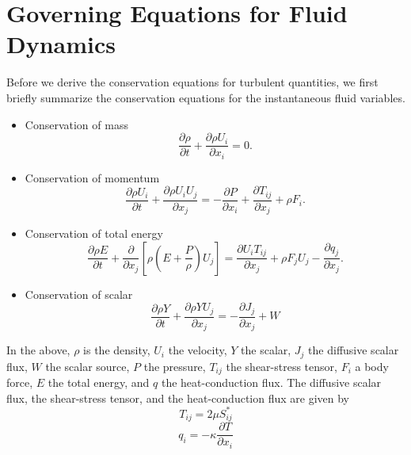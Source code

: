 \documentclass[oneside,a4paper,11pt]{report}
\begin{document}
\chapter{Governing Equations for Fluid Dynamics}
%
Before we derive the conservation equations for turbulent quantities, we first briefly summarize the conservation equations for the instantaneous fluid variables.
\begin{itemize}
\item Conservation of mass
\begin{equation}
\label{eq:cons_mass}
\frac{\partial \rho}{\partial t} + \frac{ \partial \rho U_i}{ \partial x_i} = 0.
\end{equation}
\item Conservation of momentum
\begin{equation}
\label{eq:cons_momentum}
\frac{\partial \rho U_i}{\partial t}+\frac{\partial \rho U_i U_j}{\partial x_j}=-\frac{\partial P}{\partial x_i} + \frac{\partial T_{ij}}{\partial x_j} + \rho F_i.
\end{equation}
\item Conservation of total energy
\begin{equation}
\label{eq:cons_energy}
\frac{\partial \rho E}{\partial t} + \frac{\partial}{\partial x_j} \left [ \rho \left ( E + \frac{P}{\rho} \right ) U_j \right ] = \frac{\partial U_i T_{ij}}{\partial x_j} + \rho F_j U_j - \frac{\partial q_j}{\partial x_j}.
\end{equation}
\item Conservation of scalar
\begin{equation}
    \label{eq:cons_scalar}
    \frac{\partial \rho Y}{\partial t} + \frac{\partial \rho Y U_j}{\partial x_j} = -\frac{\partial J_j}{\partial x_j} + W
\end{equation}
\end{itemize}
In the above, $\rho$ is the density, $U_i$ the velocity, $Y$ the scalar, $J_j$ the diffusive scalar flux, $W$ the scalar source, $P$ the pressure, $T_{ij}$ the shear-stress tensor, $F_i$ a body force, $E$ the total energy, and $q$ the heat-conduction flux. The diffusive scalar flux, the shear-stress tensor, and the heat-conduction flux are given by
\begin{equation}
\label{eq:shear_stress}
    T_{ij} = 2\mu S_{ij}^*
\end{equation}
\begin{equation}
    q_i = -\kappa \frac{\partial T}{\partial x_i}
\end{equation}
\end{document}
